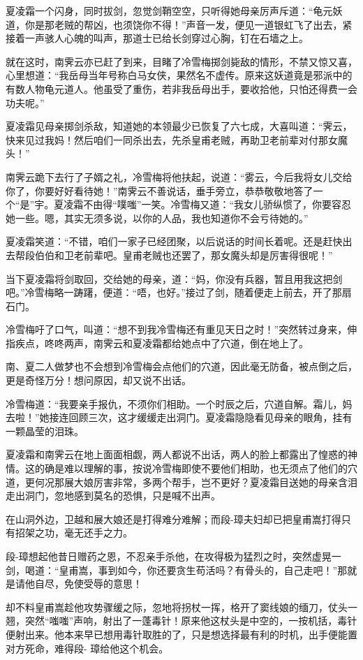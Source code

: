 \documentclass[12pt,oneside]{book}
\begin{document}
夏凌霜一个闪身，同时拔剑，忽觉剑鞘空空，只听得她母亲厉声斥道：``龟元妖道，你是那老贼的帮凶，也须饶你不得！''声音一发，便见一道银虹飞了出去，紧接着一声骇人心魄的叫声，那道士已给长剑穿过心胸，钉在石墙之上。

就在这时，南霁云亦已赶了到来，目睹了冷雪梅掷剑毙敌的情形，不禁又惊又喜，心里想道：``我岳母当年号称白马女侠，果然名不虚传。原来这妖道竟是邪派中的有数人物龟元道人。他虽受了重伤，若非我岳母出手，要收拾他，只怕还得费一会功夫呢。''

夏凌霜见母亲掷剑杀敌，知道她的本领最少已恢复了六七成，大喜叫道：``霁云，快来见过我妈！然后咱们一同杀出去，先杀皇甫老贼，再助卫老前辈对付那女魔头！''

南霁云跪下去行了子婿之礼，冷雪梅将他扶起，说道：``雾云，今后我将女儿交给你了，你要好好看待她！''南霁云不善说话，垂手旁立，恭恭敬敬地答了一个``是''宇。夏凌霜不由得``噗嗤''一笑。冷雪梅又道：``我女儿骄纵惯了，你要容忍她一些。嗯，其实无须多说，以你的人品，我也知道你不会亏待她的。''

夏凌霜笑道：``不错，咱们一家子已经团聚，以后说话的时间长着呢。还是赶快出去帮段伯伯和卫老前辈吧。皇甫老贼也还罢了，那女魔头却是厉害得很呢！''

当下夏凌霜将剑取回，交给她的母亲，道：``妈，你没有兵器，暂且用我这把剑吧。''冷雪梅略一踌躇，便道：``唔，也好。''接过了剑，随着便走上前去，开了那扇石门。

冷雪梅吁了口气，叫道：``想不到我冷雪梅还有重见天日之时！''突然转过身来，伸指疾点，咚咚两声，南霁云和夏凌霜都给她点中了穴道，倒在地上了。

南、夏二人做梦也不会想到冷雪梅会点他们的穴道，因此毫无防备，被点倒之后，更是奇怪万分！想问原因，却又说不出话。

冷雪梅道：``我要亲手报仇，不须你们相助。一个时辰之后，穴道自解。霜儿，妈去啦！''她接连回顾三次，这才缓缓走出洞门。夏凌霜隐隐看见母亲的眼角，挂有一颗晶莹的泪珠。

夏凌霜和南霁云在地上面面相觑，两人都说不出话，两人的脸上都露出了惶惑的神情。这的确是难以理解的事，按说冷雪梅即使不要他们相助，也无须点了他们的穴道，更何况那展大娘厉害非常，多两个帮手，岂不更好？夏凌霜目送她的母亲含泪走出洞门，忽地感到莫名的恐惧，只是喊不出声。

在山洞外边，卫越和展大娘还是打得难分难解；而段-璋夫妇却已把皇甫嵩打得只有招架之功，毫无还手之力。

段-璋想起他昔日赠药之恩，不忍亲手杀他，在攻得极为猛烈之时，突然虚晃一剑，喝道：``皇甫嵩，事到如今，你还要贪生苟活吗？有骨头的，自己走吧！''那就是请他自尽，免使受辱的意思！

却不料皇甫嵩趁他攻势骤缓之际，忽地将拐杖一挥，格开了窦线娘的缅刀，仗头一翘，突然``嗤嗤''声响，射出了一蓬毒针！原来他这杖头是中空的，一按机括，毒针便射出来。他本来早已想用毒针取胜的了，只是想选择最有利的时机，出手便能置对方死命，难得段-
璋给他这个机会。
\end{document}
